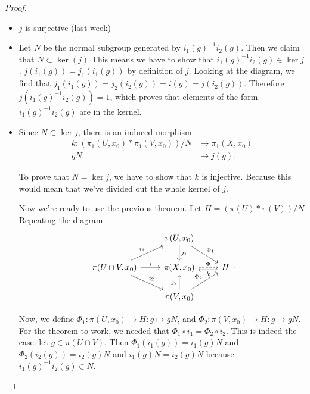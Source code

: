 \begin{proof}
    \begin{itemize}
        \item $j$ is surjective (last week)
        \item Let $N$ be the normal subgroup generated by $i_1(g)^{-1} i_2(g)$.
            Then we claim that $N \subset \ker (j)$
            This means we have to show that $i_1(g)^{-1} i_2(g) \in \ker j$.
            $j(i_1(g)) = j_1(i_1(g))$ by definition of $j$.
            Looking at the diagram, we find that $j_1(i_1(g)) = j_2(i_2(g)) = i(g) = j(i_2(g))$.
            Therefore $j(i_1(g)^{-1} i_2(g)) = 1$, which proves that elements of the form $i_1(g)^{-1} i_2(g)$ are in the kernel.
        \item Since $N \subset \ker j$, there is an induced morphism
            \begin{align*}
                k: (\pi_1(U, x_0) * \pi_1(V, x_0))  / N &\longrightarrow \pi_1(X, x_0) \\
                g N &\longmapsto j(g)
            .\end{align*}

            To prove that $N = \ker j$, we have to show that $k$ is injective. Because this would mean that we've divided out the whole kernel of $j$.

            Now we're ready to use the previous theorem.
            Let $H = (\pi(U) * \pi(V)) / N$
            Repeating the diagram:
            \[
            \begin{tikzcd}
                & \pi(U, x_0) \arrow[d, "j_1"] \arrow[dr, "\Phi_1"] &\\
                \pi(U \cap V, x_0) \arrow[u r, "i_1"] \arrow[r, "i"] \arrow[dr, "i_2"]& \pi(X, x_0) \arrow[r, dashed, "\Phi"]& H \arrow[l, shift left=1, "k"]\\
                                                                                           & \pi(V, x_0) \arrow[u, "j_2"] \arrow[u r, "\Phi_2"] &
            \end{tikzcd}
            .\] 


            Now, we define $\Phi_1: \pi(U, x_0) \to  H : g \mapsto  gN$, and $\Phi_2: \pi(V, x_0) \to  H: g \mapsto  gN$.
            For the theorem to work, we needed that $\Phi_1  \circ  i_1 = \Phi_2  \circ  i_2$.
            This is indeed the case: let $g \in \pi(U \cap V)$. Then $\Phi_1(i_1(g)) = i_1(g) N$ and $\Phi_2(i_2(g)) = i_2(g) N$ and $i_1(g) N = i_2(g) N$ because $i_1(g)^{-1} i_2(g) \in N$.


\end{itemize}
\end{proof}
